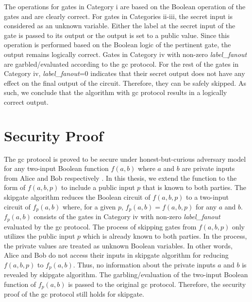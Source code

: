 The operations for gates in Category i are based on the Boolean operation of the gates and are clearly correct.
For gates in Categories ii-iii, the secret input is considered as an unknown variable.
Either the label at the secret input of the gate is passed to its output or the output is set to a public value.
Since this operation is performed based on the Boolean logic of the pertinent gate, the output remains logically correct.
Gates in Category iv with non-zero \textit{label\_fanout} are garbled/evaluated according to the \acrshort{gc} protocol.
For the rest of the gates in Category iv, \textit{label\_fanout}=0 indicates that their secret output does not have any effect on the final output of the circuit.
Therefore, they can be safely skipped.
As such, we conclude that the algorithm with \acrshort{gc} protocol results in a logically correct output.

\section{Security Proof}\label{sec:skipgate-security}
The \acrshort{gc} protocol is proved to be secure under honest-but-curious adversary model for any two-input Boolean function $f(a, b)$ where $a$ and $b$ are private inputs from Alice and Bob respectively \cite{lindell2009proof, bellare2013efficient}.
In this thesis, we extend the function to the form of $f(a, b, p)$ to include a public input $p$ that is known to both parties.
The \gls{skipgate} algorithm reduces the Boolean circuit of $f(a, b, p)$ to a two-input circuit of $f_p(a, b)$ where, for a given $p$, $f_p(a, b) = f(a, b, p)$ for any $a$ and $b$.
$f_p(a, b)$ consists of the gates in Category iv with non-zero \textit{label\_fanout} evaluated by the \acrshort{gc} protocol.
The process of skipping gates from $f(a, b, p)$ only utilizes the public input $p$ which is already known to both parties.
In the process, the private values are treated as unknown Boolean variables.
In other words, Alice and Bob do not access their inputs in \gls{skipgate} algorithm for reducing $f(a,b,p)$ to $f_p(a, b)$.
Thus, no information about the private inputs $a$ and $b$ is revealed by \gls{skipgate} algorithm.
The garbling/evaluation of the two-input Boolean function of $f_p(a,b)$ is passed to the original \acrshort{gc} protocol.
Therefore, the security proof of the \acrshort{gc} protocol still holds for \gls{skipgate}.
